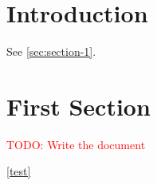 \documentclass[twoside,openright,english]{article}
\newcommand{\todo}[1]{\textcolor{red}{TODO: #1}}
\begin{document}
%
%

%
%
\setcounter{page}{1}
\tableofcontents{}

\section*{Introduction}

See \autoref{sec:section-1}.

\section{First Section}
\label{sec:section-1}

\todo{Write the document}

\label{test}
\autoref{test}
\cite{revng}

%
%



%
%

\end{document}
